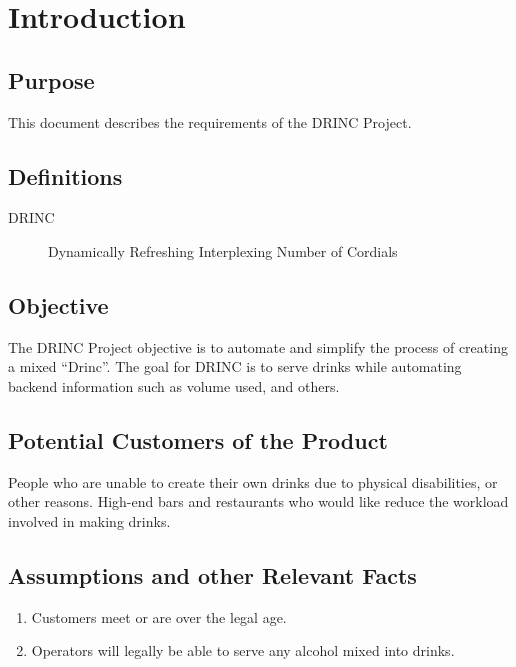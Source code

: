 \setcounter{page}{1}

\chapter{Introduction}

\section{Purpose}

This document describes the requirements of the DRINC Project.


\section{Definitions}

\begin{description}
    \item[DRINC] Dynamically Refreshing Interplexing Number of Cordials
\end{description}

\section{Objective}

The DRINC Project objective is to automate and simplify the process of creating a mixed ``Drinc''. The goal for DRINC is to serve drinks while automating backend information such as volume used, and others.

\section{Potential Customers of the Product}

People who are unable to create their own drinks due to physical disabilities, or other reasons. High-end bars and restaurants who would like reduce the workload involved in making drinks.

\section{Assumptions and other Relevant Facts}

\begin{enumerate}
	\item Customers meet or are over the legal age.
	\item Operators will legally be able to serve any alcohol mixed into drinks.
\end{enumerate}

